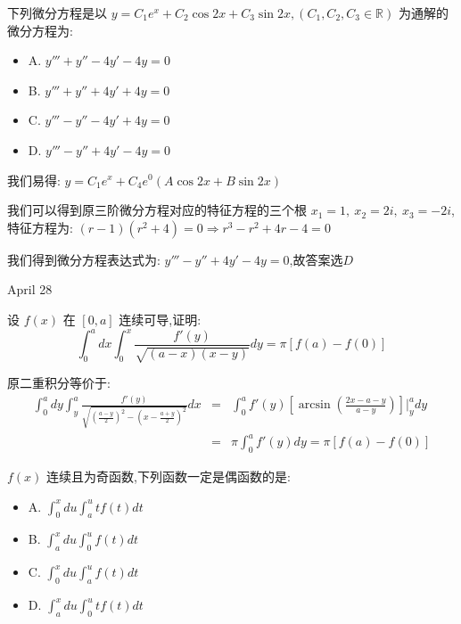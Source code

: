 \begin{example}[][Exam: 30.4.12]
	下列微分方程是以 $y=C_{1}e^x+C_{2}\cos 2x+C_{3}\sin 2x,(C_{1},C_{2},C_{3}\in \mathbb{R})$ 为通解的微分方程为: 
\begin{itemize}
	\item A. $y'''+y''-4y'-4y=0$
	\item B. $y'''+y''+4y'+4y=0$
	\item C. $y'''-y''-4y'+4y=0$
	\item D. $y'''-y''+4y'-4y=0$
\end{itemize}
\end{example}

\begin{solution}
	
	我们易得: $y=C_{1}e^{x}+C_{4}e^{0}(A\cos 2x+B\sin 2x)$
	
	我们可以得到原三阶微分方程对应的特征方程的三个根 $x_{1}=1,\ x_{2}=2i,\ x_{3}=-2i$,特征方程为: $(r-1)(r^2+4)=0\Rightarrow r^3-r^2+4r-4=0$
	
	我们得到微分方程表达式为: $y'''-y''+4y'-4y=0$,故答案选$D$
\end{solution}


\textcolor{purplea}{April 28}

\begin{example}[][Exam: 30.4.13]
	 设 $f(x)$ 在 $[0,a]$ 连续可导,证明: 
	 $$\int_{0}^{a}dx\int_{0}^{x}\dfrac{f'(y)}{\sqrt{(a-x)(x-y)}}dy=\pi[f(a)-f(0)]$$
\end{example}

\begin{solution}
	
	原二重积分等价于: 
	\begin{eqnarray*}
		\int_{0}^{a}dy\int_{y}^{a}\frac{f'(y)}{\sqrt{(\frac{a-y}{2})^2-(x-\frac{a+y}{2})^2}}dx&=&\int_{0}^{a}f'(y)[\arcsin (\frac{2x-a-y}{a-y})]|_{y}^{a}dy\\
		&=&\pi\int_{0}^{a}f'(y)dy=\pi[f(a)-f(0)]
	\end{eqnarray*}
	
\end{solution}

\begin{example}[][Exam: 30.4.14]
	$f(x)$ 连续且为奇函数,下列函数一定是偶函数的是: 
\begin{itemize}
	\item A. $\int_{0}^{x}du\int_{a}^{u}tf(t)dt$ 
	\item B. $\int_{a}^{x}du\int_{0}^{u}f(t)dt$ 
	\item C. $\int_{0}^{x}du\int_{a}^{u}f(t)dt$ 
	\item D. $\int_{a}^{x}du\int_{0}^{u}tf(t)dt$ 
\end{itemize}
\end{example}

